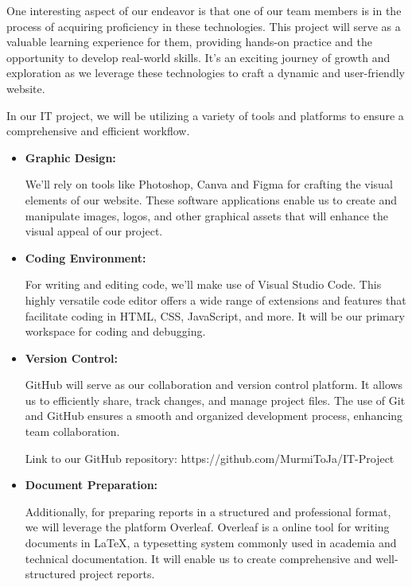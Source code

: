 \documentclass{article}
\begin{document}
One interesting aspect of our endeavor is that one of our team members is in the process of acquiring proficiency in these technologies. This project will serve as a valuable learning experience for them, providing hands-on practice and the opportunity to develop real-world skills. It's an exciting journey of growth and exploration as we leverage these technologies to craft a dynamic and user-friendly website.
\par
\par
In our IT project, we will be utilizing a variety of tools and platforms to ensure a comprehensive and efficient workflow.
\begin{itemize}
    \item \textbf{Graphic Design:} \par
    We'll rely on tools like Photoshop, Canva and Figma for crafting the visual elements of our website. These software applications enable us to create and manipulate images, logos, and other graphical assets that will enhance the visual appeal of our project.
    \item \textbf{Coding Environment:}\par
For writing and editing code, we'll make use of Visual Studio Code. This highly versatile code editor offers a wide range of extensions and features that facilitate coding in HTML, CSS, JavaScript, and more. It will be our primary workspace for coding and debugging.
\item \textbf{Version Control:} \par

GitHub will serve as our collaboration and version control platform. It allows us to efficiently share, track changes, and manage project files. The use of Git and GitHub ensures a smooth and organized development process, enhancing team collaboration.\par
Link to our GitHub repository: 
https://github.com/MurmiToJa/IT-Project


\item \textbf{Document Preparation:} \par

Additionally, for preparing reports in a structured and professional format, we will leverage the platform Overleaf. Overleaf is a  online tool for writing documents in LaTeX, a typesetting system commonly used in academia and technical documentation. It will enable us to create comprehensive and well-structured project reports.



\end{itemize}

 \restoregeometry   
\end{document}

